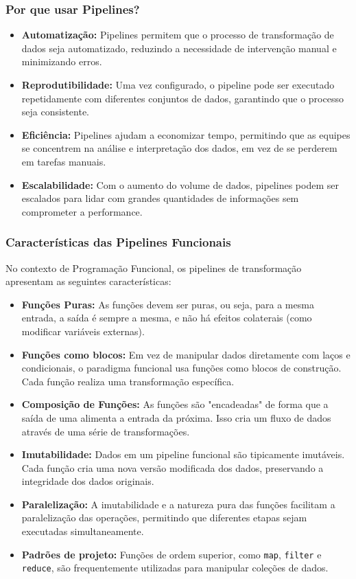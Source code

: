 \subsubsection{Por que usar Pipelines?}
\begin{itemize}
    \item \textbf{Automatização:} Pipelines permitem que o processo de transformação de dados seja automatizado, reduzindo a necessidade de intervenção manual e minimizando erros.
    \item \textbf{Reprodutibilidade:} Uma vez configurado, o pipeline pode ser executado repetidamente com diferentes conjuntos de dados, garantindo que o processo seja consistente.
    \item \textbf{Eficiência:} Pipelines ajudam a economizar tempo, permitindo que as equipes se concentrem na análise e interpretação dos dados, em vez de se perderem em tarefas manuais.
    \item \textbf{Escalabilidade:} Com o aumento do volume de dados, pipelines podem ser escalados para lidar com grandes quantidades de informações sem comprometer a performance.
\end{itemize}

\subsubsection{Características das Pipelines Funcionais}
No contexto de Programação Funcional, os pipelines de transformação apresentam as seguintes características:
\begin{itemize}
    \item \textbf{Funções Puras:} As funções devem ser puras, ou seja, para a mesma entrada, a saída é sempre a mesma, e não há efeitos colaterais (como modificar variáveis externas).
    \item \textbf{Funções como blocos:} Em vez de manipular dados diretamente com laços e condicionais, o paradigma funcional usa funções como blocos de construção. Cada função realiza uma transformação específica.
    \item \textbf{Composição de Funções:} As funções são "encadeadas" de forma que a saída de uma alimenta a entrada da próxima. Isso cria um fluxo de dados através de uma série de transformações.
    \item \textbf{Imutabilidade:} Dados em um pipeline funcional são tipicamente imutáveis. Cada função cria uma nova versão modificada dos dados, preservando a integridade dos dados originais.
    \item \textbf{Paralelização:} A imutabilidade e a natureza pura das funções facilitam a paralelização das operações, permitindo que diferentes etapas sejam executadas simultaneamente.
    \item \textbf{Padrões de projeto:} Funções de ordem superior, como \texttt{map}, \texttt{filter} e \texttt{reduce}, são frequentemente utilizadas para manipular coleções de dados.
\end{itemize}

